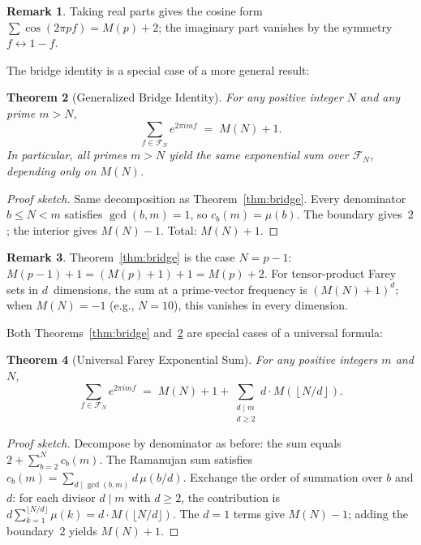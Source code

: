 \documentclass[11pt]{article}
\newtheorem{theorem}{Theorem}[section]
\theoremstyle{definition}
\newtheorem{remark}[theorem]{Remark}
\newcommand{\F}{\mathcal{F}}
\begin{document}
\begin{remark}
Taking real parts gives the cosine form
$\sum \cos(2\pi pf) = M(p) + 2$;
the imaginary part vanishes by the symmetry $f \leftrightarrow 1 - f$.
\end{remark}

The bridge identity is a special case of a more general result:

\begin{theorem}[Generalized Bridge Identity]\label{thm:gen-bridge}
For any positive integer $N$ and any prime $m > N$,
\begin{equation}\label{eq:gen-bridge}
  \sum_{f \in \F_N} e^{2\pi i m f} \;=\; M(N) + 1.
\end{equation}
In particular, all primes $m > N$ yield the \emph{same}
exponential sum over $\F_N$, depending only on $M(N)$.
\end{theorem}

\begin{proof}[Proof sketch]
Same decomposition as Theorem~\ref{thm:bridge}.  Every
denominator $b \le N < m$ satisfies $\gcd(b, m) = 1$,
so $c_b(m) = \mu(b)$.  The boundary gives~$2$; the
interior gives $M(N) - 1$.  Total: $M(N) + 1$.
\end{proof}

\begin{remark}
Theorem~\ref{thm:bridge} is the case $N = p - 1$:
$M(p-1) + 1 = (M(p) + 1) + 1 = M(p) + 2$.
For tensor-product Farey sets in $d$~dimensions, the sum
at a prime-vector frequency is $(M(N)+1)^d$; when $M(N) = -1$
(e.g., $N = 10$), this vanishes in every dimension.
\end{remark}

Both Theorems~\ref{thm:bridge} and~\ref{thm:gen-bridge} are
special cases of a universal formula:

\begin{theorem}[Universal Farey Exponential Sum]\label{thm:universal}
For any positive integers $m$ and $N$,
\begin{equation}\label{eq:universal}
  \sum_{f \in \F_N} e^{2\pi i m f}
  \;=\; M(N) + 1
  + \sum_{\substack{d \mid m \\ d \ge 2}} d \cdot M\!\left(\left\lfloor N/d \right\rfloor\right).
\end{equation}
\end{theorem}

\begin{proof}[Proof sketch]
Decompose by denominator as before: the sum equals $2 + \sum_{b=2}^{N}
c_b(m)$.  The Ramanujan sum satisfies $c_b(m) = \sum_{d \mid \gcd(b,m)}
d\,\mu(b/d)$.  Exchange the order of summation over $b$ and $d$:
for each divisor $d \mid m$ with $d \ge 2$, the contribution is
$d \sum_{k=1}^{\lfloor N/d \rfloor} \mu(k) = d \cdot M(\lfloor N/d \rfloor)$.
The $d = 1$ terms give $M(N) - 1$; adding the boundary~$2$ yields
$M(N) + 1$.
\end{proof}
\end{document}
